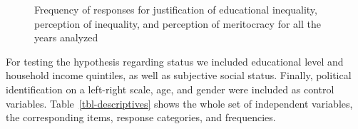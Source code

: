 \documentclass[
]{article}
\begin{document}
\begin{figure}[H]


\caption{\label{fig-frecuencies}Frequency of responses for justification
of educational inequality, perception of inequality, and perception of
meritocracy for all the years analyzed}

\end{figure}%

For testing the hypothesis regarding status we included educational
level and household income quintiles, as well as subjective social
status. Finally, political identification on a left-right scale, age,
and gender were included as control variables.
Table~\ref{tbl-descriptives} shows the whole set of independent
variables, the corresponding items, response categories, and
frequencies.
\end{document}
